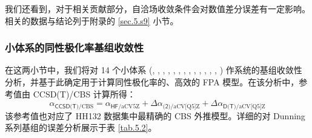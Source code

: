 我们还看到，对于相关贡献部分，自洽场收敛条件会对数值差分误差有一定影响。相关的数据与结论列于附录的 \ref{sec.5.s9} 小节。

\subsubsection{小体系的同性极化率基组收敛性}

在这两小节中，我们将对 14 个小体系 (, , , , , , , , , , , , , ) 作系统的基组收敛性分析，并基于此确定用于计算同性极化率的、高效的 FPA 模型。在该分析中，参考值由 CCSD(T)/CBS 计算所得：
\begin{equation*}
    \alpha_{\textsf{CCSD(T)}/\text{CBS}} = \alpha_{\textsf{HF}/\text{aCV5Z}} + \Delta \alpha_{\textsf{(2)}/\text{aCV[Q5]Z}} + \Delta \alpha_{\textsf{D(T)}/\text{aCV[Q5]Z}}
\end{equation*}
该参考值也对应了 HH132 数据集中最精确的 CBS 外推模型。详细的对 Dunning 系列基组的误差分析展示于表 \ref{tab.5.2}。

